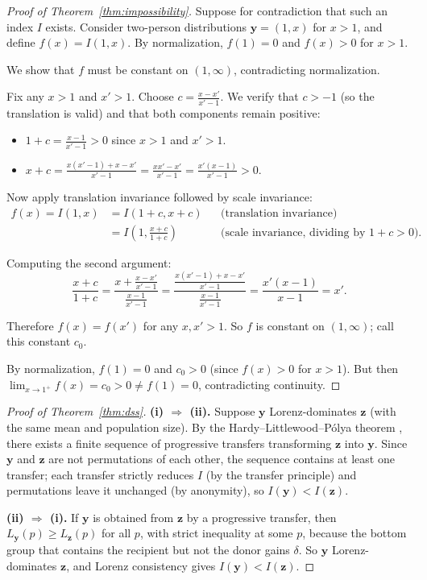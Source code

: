 \documentclass[12pt]{article}
\theoremstyle{plain}
\theoremstyle{definition}
\theoremstyle{remark}
\newcommand{\bfy}{\mathbf{y}}
\newcommand{\bfz}{\mathbf{z}}
\begin{document}
\begin{proof}[Proof of Theorem~\ref{thm:impossibility}]
Suppose for contradiction that such an index $I$ exists.
Consider two-person distributions $\bfy = (1, x)$ for $x > 1$, and define $f(x) = I(1, x)$.
By normalization, $f(1) = 0$ and $f(x) > 0$ for $x > 1$.

We show that $f$ must be constant on $(1, \infty)$, contradicting normalization.

Fix any $x > 1$ and $x' > 1$.
Choose $c = \frac{x - x'}{x' - 1}$.
We verify that $c > -1$ (so the translation is valid) and that both components remain positive:
\begin{itemize}
    \item $1 + c = \frac{x - 1}{x' - 1} > 0$ since $x > 1$ and $x' > 1$.
    \item $x + c = \frac{x(x'-1) + x - x'}{x'-1} = \frac{xx' - x'}{x'-1} = \frac{x'(x-1)}{x'-1} > 0$.
\end{itemize}

Now apply translation invariance followed by scale invariance:
\begin{align}
f(x) = I(1, x) &= I(1 + c, x + c) && \text{(translation invariance)} \nonumber\\
&= I\!\left(1, \frac{x + c}{1 + c}\right) && \text{(scale invariance, dividing by $1+c > 0$).} \label{eq:impossible}
\end{align}

Computing the second argument:
\begin{equation}
\frac{x + c}{1 + c} = \frac{x + \frac{x - x'}{x'-1}}{\frac{x-1}{x'-1}} = \frac{\frac{x(x'-1) + x - x'}{x'-1}}{\frac{x-1}{x'-1}} = \frac{x'(x-1)}{x-1} = x'.
\end{equation}

Therefore $f(x) = f(x')$ for any $x, x' > 1$.
So $f$ is constant on $(1, \infty)$; call this constant $c_0$.

By normalization, $f(1) = 0$ and $c_0 > 0$ (since $f(x) > 0$ for $x > 1$).
But then $\lim_{x \to 1^+} f(x) = c_0 > 0 \neq f(1) = 0$, contradicting continuity.
\end{proof}

\begin{proof}[Proof of Theorem~\ref{thm:dss}]
\textbf{(i) $\Rightarrow$ (ii).}
Suppose $\bfy$ Lorenz-dominates $\bfz$ (with the same mean and population size).
By the Hardy--Littlewood--P\'olya theorem \citep{Hardy1934}, there exists a finite sequence of progressive transfers transforming $\bfz$ into $\bfy$.
Since $\bfy$ and $\bfz$ are not permutations of each other, the sequence contains at least one transfer; each transfer strictly reduces $I$ (by the transfer principle) and permutations leave it unchanged (by anonymity), so $I(\bfy) < I(\bfz)$.

\textbf{(ii) $\Rightarrow$ (i).}
If $\bfy$ is obtained from $\bfz$ by a progressive transfer, then $L_{\bfy}(p) \geq L_{\bfz}(p)$ for all $p$, with strict inequality at some $p$, because the bottom group that contains the recipient but not the donor gains $\delta$.
So $\bfy$ Lorenz-dominates $\bfz$, and Lorenz consistency gives $I(\bfy) < I(\bfz)$.
\end{proof}
\end{document}
